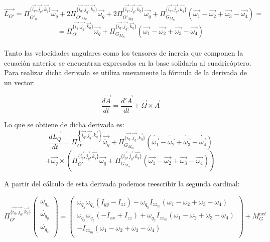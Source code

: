 \documentclass[main]{subfiles}
\begin{document}
$$\vec{L_{O\prime}} =\Pi_{O\prime_q}^{\{\vec{i_q}, \vec{j_q}, \vec{k_q}\}}\vec{\omega_q}+2\Pi_{O\prime_{Mx}}^{\{\vec{i_q}, \vec{j_q}, \vec{k_q}\}}\vec{\omega_q}+2\Pi_{O\prime_{My}}^{\{\vec{i_q}, \vec{j_q}, \vec{k_q}\}}\vec{\omega_q}+\Pi_{G_{M_{m}}}^{\{\vec{i_q}, \vec{j_q}, \vec{k_q}\}}(\vec{\omega_1}-\vec{\omega_2}+\vec{\omega_3}-\vec{\omega_4})=$$
$$=\Pi_{O\prime}^{\{\vec{i_q}, \vec{j_q}, \vec{k_q}\}}\vec{\omega_q}+\Pi_{G_{M_{m}}}^{\{\vec{i_q}, \vec{j_q}, \vec{k_q}\}}(\vec{\omega_1}-\vec{\omega_2}+\vec{\omega_3}-\vec{\omega_4})$$\\


Tanto las velocidades angulares como los tensores de inercia que componen la ecuaci\'on anterior se encuentran expresados en la base solidaria al cuadric\'optero. Para realizar dicha derivada se utiliza nuevamente la f\'ormula de la derivada de un vector:

$$\frac{d\vec{A}}{dt} =\frac{d\prime\vec{A}}{dt}+\vec{\Omega}\times\vec{A} $$

Lo que se obtiene de dicha derivada es:
$$
\frac{d\vec{L_Q}}{dt} = \Pi_{O\prime}^{\left\lbrace\vec{i_q}, \vec{j_q}, \vec{k_q}\right\rbrace}\vec{\dot{\omega_q}}+\Pi_{G_{M_{m}}}^{\{\vec{i_q}, \vec{j_q}, \vec{k_q}\}}(\dot{\vec{\omega_1}}-\dot{\vec{\omega_2}}+\dot{\vec{\omega_3}}-\dot{\vec{\omega_4}})$$$$
+\vec{\omega_q}\times(\Pi_{O\prime}^{\{\vec{i_q}, \vec{j_q}, \vec{k_q}\}}\vec{\omega_q}+\Pi_{G_{M_{m}}}^{\{\vec{i_q}, \vec{j_q}, \vec{k_q}\}}(\vec{\omega_1}-\vec{\omega_2}+\vec{\omega_3}-\vec{\omega_4}))$$

A partir del c\'alculo de esta derivada podemos reescribir la segunda cardinal:

\begin{equation}
 \Pi_{O\prime}^{\{\vec{i_q}, \vec{j_q}, \vec{k_q}\}}\left(\begin{array}{c}
\dot{\omega_{q_x}}\\
\dot{\omega_{q_y}}\\
\dot{\omega_{q_z}}\\
\end{array}\right) = \left(\begin{array}{c}
\omega_{q_y}\omega_{q_z}(I_{yy}-I_{zz})-\omega_{q_y}I_{zz_m}(\omega_1-\omega_2+\omega_3-\omega_4)\\

\omega_{q_x}\omega_{q_z}(-I_{xx}+I_{zz})+\omega_{q_x}I_{zz_m}(\omega_1-\omega_2+\omega_3-\omega_4)\\

-I_{zz_m}(\dot{\omega_1}-\dot{\omega_2}+\dot{\omega_3}-\dot{\omega_4})\\

\end{array}\right) + M_G^{ext}
\label{eq:omegas}
\end{equation}
\end{document}
